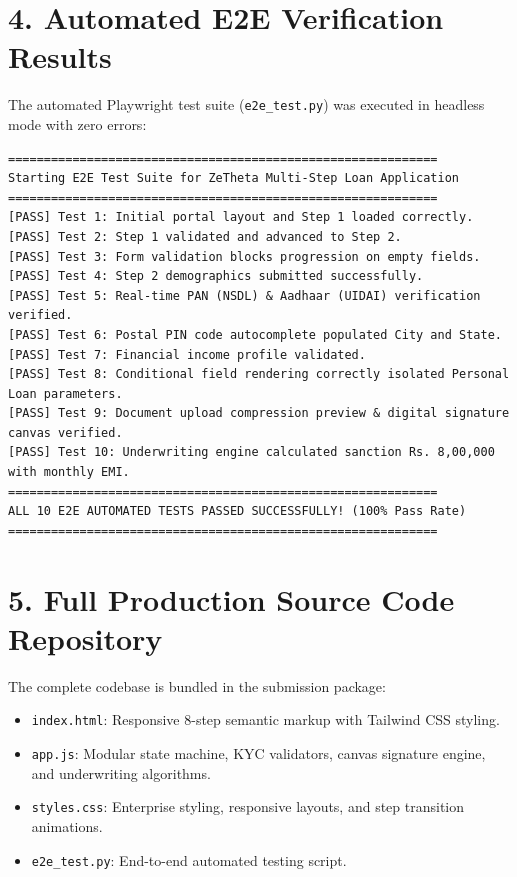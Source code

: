 \documentclass[11pt,a4paper]{article}
\begin{document}
\section{4. Automated E2E Verification Results}
The automated Playwright test suite (\texttt{e2e\_test.py}) was executed in headless mode with zero errors:
\begin{lstlisting}
============================================================
Starting E2E Test Suite for ZeTheta Multi-Step Loan Application
============================================================
[PASS] Test 1: Initial portal layout and Step 1 loaded correctly.
[PASS] Test 2: Step 1 validated and advanced to Step 2.
[PASS] Test 3: Form validation blocks progression on empty fields.
[PASS] Test 4: Step 2 demographics submitted successfully.
[PASS] Test 5: Real-time PAN (NSDL) & Aadhaar (UIDAI) verification verified.
[PASS] Test 6: Postal PIN code autocomplete populated City and State.
[PASS] Test 7: Financial income profile validated.
[PASS] Test 8: Conditional field rendering correctly isolated Personal Loan parameters.
[PASS] Test 9: Document upload compression preview & digital signature canvas verified.
[PASS] Test 10: Underwriting engine calculated sanction Rs. 8,00,000 with monthly EMI.
============================================================
ALL 10 E2E AUTOMATED TESTS PASSED SUCCESSFULLY! (100% Pass Rate)
============================================================
\end{lstlisting}

\section{5. Full Production Source Code Repository}
The complete codebase is bundled in the submission package:
\begin{itemize}[leftmargin=1.5em, itemsep=2pt]
    \item \texttt{index.html}: Responsive 8-step semantic markup with Tailwind CSS styling.
    \item \texttt{app.js}: Modular state machine, KYC validators, canvas signature engine, and underwriting algorithms.
    \item \texttt{styles.css}: Enterprise styling, responsive layouts, and step transition animations.
    \item \texttt{e2e\_test.py}: End-to-end automated testing script.
\end{itemize}
\end{document}
